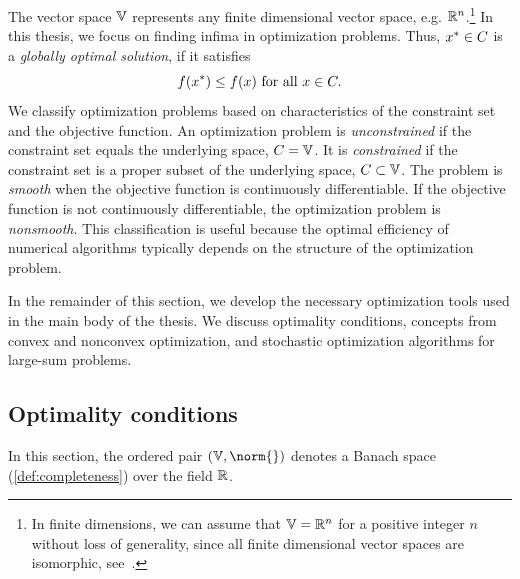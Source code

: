 The vector space \( \mathbb{V} \) represents any finite dimensional vector space, e.g. \( \mathbb{R}^n \).\footnote{
	In finite dimensions, we can assume that \( \mathbb{V} = \mathbb{R}^n \) for a positive integer \( n \) without loss of generality, since all finite dimensional vector spaces are isomorphic, see~\cite[theorem 3.70]{Axler2023-ki}.
}
In this thesis, we focus on finding infima in optimization problems.
Thus, \( x^\ast \in C \) is a \emph{globally optimal solution}, if it satisfies
\begin{equation}
	f(x^\ast) \leq f(x)\ \text{for all}\ x \in C.
\end{equation}
We classify optimization problems based on characteristics of the constraint set and the objective function.
An optimization problem is \emph{unconstrained} if the constraint set equals the underlying space, \( C = \mathbb{V} \).
It is \emph{constrained} if the constraint set is a proper subset of the underlying space, \( C \subset \mathbb{V} \).
The problem is \emph{smooth} when the objective function is continuously differentiable.
If the objective function is not continuously differentiable, the optimization problem is \emph{nonsmooth}.
This classification is useful because the optimal efficiency of numerical algorithms typically depends on the structure of the optimization problem.

In the remainder of this section, we develop the necessary optimization tools used in the main body of the thesis.
We discuss optimality conditions, concepts from convex and nonconvex optimization, and stochastic optimization algorithms for large-sum problems.
\subsection{Optimality conditions}
In this section, the ordered pair \( (\V, \norm{}) \) denotes a Banach space (\cref{def:completeness}) over the field \( \mathbb{R} \).

